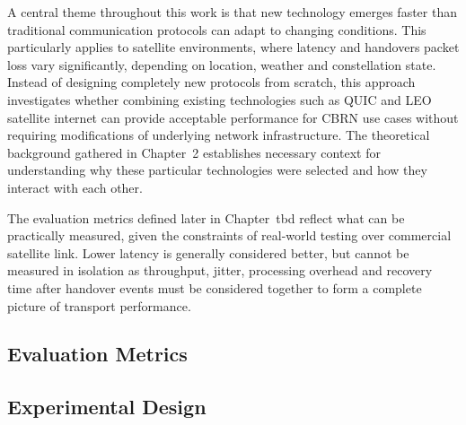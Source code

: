 A central theme throughout this work is that new technology emerges faster than traditional communication protocols can adapt to changing conditions. This particularly applies to satellite environments, where latency and handovers packet loss vary significantly, depending on location, weather and constellation state. Instead of designing completely new protocols from scratch, this approach investigates whether combining existing technologies such as QUIC and LEO satellite internet can provide acceptable performance for CBRN use cases without requiring modifications of underlying network infrastructure. The theoretical background gathered in Chapter~2 establishes necessary context for understanding why these particular technologies were selected and how they interact with each other.
\par
The evaluation metrics defined later in Chapter~tbd reflect what can be practically measured, given the constraints of real-world testing over commercial satellite link. Lower latency is generally considered better, but cannot be measured in isolation as throughput, jitter, processing overhead and recovery time after handover events must be considered together to form a complete picture of transport performance.
\subsection{Evaluation Metrics}
\subsection{Experimental Design}
\clearpage


